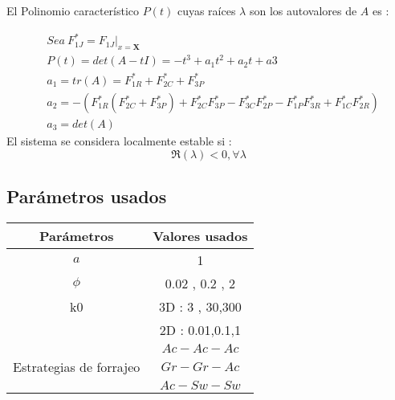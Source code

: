 El Polinomio caracter\'istico $P(t)$ cuyas ra\'ices $\lambda$ son los autovalores de $A$ es :

\begin{equation}
\begin{aligned}
& Sea \ F^*_{1J} = \left. F_{1J}\right|_{x=\mathbf{X}} \\
&P(t) = det(A-tI) = - t^3 + a_1t^2 + a_2 t + a3 \\
& a_1 = tr(A) = F^*_{1R}  + F^*_{2C} + F^*_{3P} \\
& a_2 =  -(F^*_{1R}(F^*_{2C}+F^*_{3P}) + F^*_{2C}F^*_{3P} - F^*_{3C}F^*_{2P} - F^*_{1P}F^*_{3R} + F^*_{1C}F^*_{2R}) \\
& a_3 = det(A) 
\end{aligned}
\end{equation}
El sistema se considera localmente estable \citep{yodzis1989introduction} si :
\begin{equation}\label{eq:estab}
\Re(\lambda) < 0 , \forall  \lambda
\end{equation}

\subsection{Par\'ametros usados}\label{subsec:params}

\begin{longtable}{|c|c|}
\hline
Par\'ametros & Valores usados \\
\hline
$a$ & 1 \\
$\phi$ & 0.02 , 0.2 , 2 \\
\hline
k0 & 3D : 3 , 30,300 \\
   & 2D : 0.01,0.1,1 \\
\hline
& $Ac-Ac-Ac$ \\
Estrategias de forrajeo& $Gr-Gr-Ac$ \\
& $Ac-Sw-Sw$ \\
\hline
\end{longtable}
